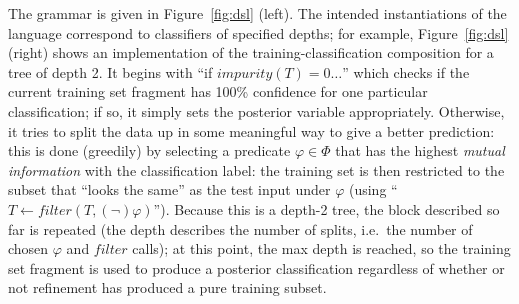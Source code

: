 The grammar is given in Figure~\ref{fig:dsl} (left).
The intended instantiations of the language correspond
to classifiers of specified depths;
for example, Figure~\ref{fig:dsl} (right) shows an implementation of
the training-classification composition for a tree of depth 2.
It begins with ``if $\mathit{impurity}(T) = 0 \ldots$''
which checks if the current training set fragment has 100\% confidence
for one particular classification;
if so, it simply sets the posterior variable appropriately.
Otherwise, it tries to split the data up in some meaningful way
to give a better prediction:
this is done (greedily) by selecting a predicate $\varphi \in \Phi$
that has the highest \emph{mutual information} with the classification label:
the training set is then restricted to the subset
that ``looks the same'' as the test input under $\varphi$
(using ``$T \gets \mathit{filter}(T, (\lnot)\varphi)$'').
Because this is a depth-2 tree, the block described so far is repeated
(the depth describes the number of splits, i.e.\ the number of
chosen $\varphi$ and $\mathit{filter}$ calls);
at this point, the max depth is reached,
so the training set fragment is used to produce a posterior classification
regardless of whether or not refinement has produced a pure training subset.
